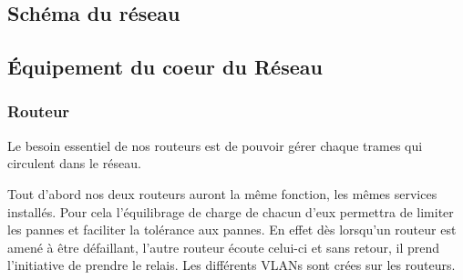 %
    \cleardoublepage
%
%
\subsection{Schéma du réseau}






%
%


%
%
\subsection{Équipement du coeur du Réseau}

%
\subsubsection{Routeur}

Le besoin essentiel de nos routeurs est de pouvoir gérer chaque trames qui circulent dans le réseau.

Tout d'abord nos deux routeurs auront la même fonction, les mêmes services installés.
Pour cela l'équilibrage de charge de chacun d'eux permettra de limiter les pannes et faciliter la tolérance aux pannes. En effet dès lorsqu'un routeur est amené à être défaillant, l'autre routeur écoute celui-ci et sans retour, il prend l'initiative de prendre le relais. Les différents VLANs sont crées sur les routeurs.

